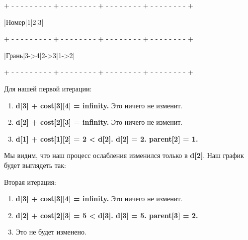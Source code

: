 \begin{tcolorbox}
{\tiny+ -  -  -  -  -  -  -  -  -  + -  -  -  -  -  -  -  -  + -  -  -  -  -  -  -  -  + -  -  -  -  -  -  -  -  +}

\hspace{0.4mm}|\hspace{2.7mm}Номер\hspace{2.7mm}|\hspace{6.82mm}1\hspace{6.82mm}|\hspace{6.82mm}2\hspace{6.82mm}|\hspace{6.82mm}3\hspace{6.82mm}|

{\tiny+ - - - - - - - - - + - - - - - - - - + - - - - - - - - + - - - - - - - - +}

\hspace{0.4mm}|\hspace{3mm}Грань\hspace{3mm}|\hspace{3.55mm}3->4\hspace{3.55mm}|\hspace{3.55mm}2->3\hspace{3.55mm}|\hspace{3.55mm}1->2\hspace{3.55mm}|

{\tiny+ - - - - - - - - - + - - - - - - - - + - - - - - - - - + - - - - - - - - +}
\end{tcolorbox}

Для нашей первой итерации:

\begin{enumerate}
\item \textbf{d[3] + cost[3][4] = infinity.} Это ничего не изменит.
\item \textbf{d[2] + cost[2][3] = infinity.} Это ничего не изменит.
\item \textbf{d[1] + cost[1][2] = 2 < d[2]. d[2] = 2. parent[2] = 1.}
\end{enumerate}

Мы видим, что наш процесс ослабления изменился только в \textbf{d[2]}. Наш график будет
выглядеть так:


Вторая итерация:

\begin{enumerate}
\item \textbf{d[3] + cost[3][4] = infinity.} Это ничего не изменит.
\item \textbf{d[2] + cost[2][3] = 5 < d[3]. d[3] = 5. parent[3] = 2.}
\item Это не будет изменено.
\end{enumerate}

